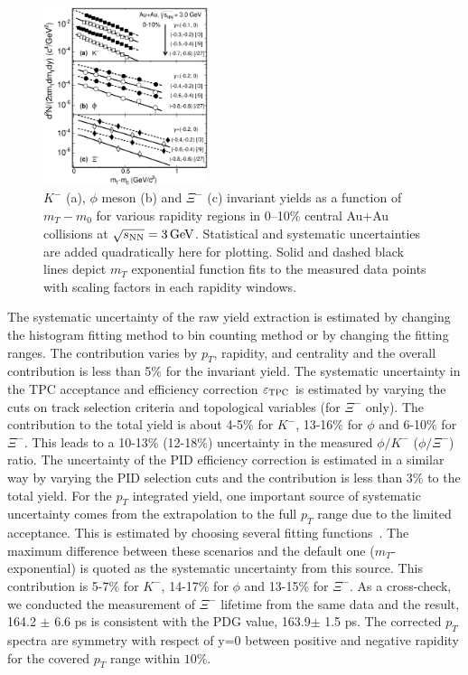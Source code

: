 \documentclass[%
 reprint,	
showpacs,
 amsmath,amssymb,
 aps,
 superscriptaddress,
]{revtex4-1}
\begin{document}
\begin{figure}
\centering
\hspace*{-4mm}
\includegraphics[width=0.43\textwidth]{fig2_h_mT_spectra_phiMeson.eps}
  \caption{$K^-$ (a), $\phi$ meson (b) and $\Xi^-$ (c) invariant yields as a function of $m_T-m_0$ for various rapidity regions in 0--10\% central Au+Au collisions at ${\sqrt{s_{\rm NN}} = \rm{3\,GeV}}$. Statistical and systematic uncertainties are added quadratically here for plotting. Solid and dashed black lines depict $m_T$ exponential function fits to the measured data points with scaling factors in each rapidity windows.}
\label{fig:phimTSpectra} 
\end{figure}

The systematic uncertainty of the raw yield extraction is estimated by changing the histogram fitting method to bin counting method or by changing the fitting ranges. The contribution varies by $p_T$, rapidity, and centrality and the overall contribution is less than 5\% for the invariant yield. The systematic uncertainty in the TPC acceptance and efficiency correction $\varepsilon_{\rm TPC}$ is estimated by varying the cuts on track selection criteria and topological variables (for $\Xi^-$ only). The contribution to the total yield is about 4-5\% for $K^-$, 13-16\% for $\phi$ and 6-10\% for $\Xi^-$. This leads to a 10-13\% (12-18\%) uncertainty in the measured $\phi/K^-$ ($\phi/\Xi^-$) ratio. The uncertainty of the PID efficiency correction is estimated in a similar way by varying the PID selection cuts and the contribution is less than 3\% to the total yield.
For the $p_T$ integrated yield, one important source of systematic uncertainty comes from the extrapolation to the full $p_T$ range due to the limited acceptance. This is estimated by choosing several fitting functions~\cite{STAR_particleYield}. The maximum difference between these scenarios and the default one ($m_T$-exponential) is quoted as the systematic uncertainty from this source. This contribution is 5-7\% for $K^-$, 14-17\% for $\phi$ and 13-15\% for $\Xi^-$. As a cross-check, we conducted the measurement of $\Xi^{-}$ lifetime from the same data and the result, 164.2 $\pm$ 6.6 ps is consistent with the PDG value, 163.9$ \pm$ 1.5 ps. The corrected $p_T$ spectra are symmetry with respect of y=0 between positive and negative rapidity for the covered $p_T$ range within $10\%$.
\end{document}
